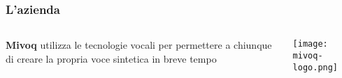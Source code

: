 \begin{frame}
  \frametitle{L'azienda}
  \begin{columns}
    \begin{column}{0.4\textwidth}
      \textbf{Mivoq} utilizza le tecnologie vocali per permettere a 
      chiunque di creare la propria voce sintetica in breve tempo
    \end{column}
    \begin{column}{0.6\textwidth}
      \texttt{[image: mivoq-logo.png]}
    \end{column}	
  \end{columns}
\end{frame}







